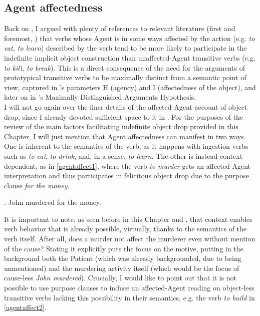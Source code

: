 \subsection{Agent affectedness} 

Back on , I argued with plenty of references to relevant literature (first and foremost, \textcite{Naess2007}) that verbs whose Agent is in some ways affected by the action (e.g. \textit{to eat, to learn}) described by the verb tend to be more likely to participate in the indefinite implicit object construction than unaffected-Agent transitive verbs (e.g. \textit{to kill, to break}). This is a direct consequence of the need for the arguments of prototypical transitive verbs to be maximally distinct from a semantic point of view, captured in \textcite{HopperThompson1980}'s parameters H (agency) and I (affectedness of the object), and later on in \textcite{Naess2007}'s Maximally Distinguished Arguments Hypothesis.\\
I will not go again over the finer details of the affected-Agent account of object drop, since I already devoted sufficient space to it in . For the purposes of the review of the main factors facilitating indefinite object drop provided in this Chapter, I will just mention that Agent affectedness can manifest in two ways. One is inherent to the semantics of the verb, as it happens with ingestion verbs such as \textit{to eat}, \textit{to drink}, and, in a sense, \textit{to learn}. The other is instead context-dependent, as in \ref{agentaffect1}, where the verb \textit{to murder} gets an affected-Agent interpretation and thus participates in felicitous object drop due to the purpose clause \textit{for the money}.

\ex. \label{agentaffect1} John murdered for the money. \hfill \parencite[136]{Naess2007}

It is important to note, as seen before in this Chapter and , that context enables verb behavior that is already possible, virtually, thanks to the semantics of the verb itself. After all, does a murder not affect the murderer even without mention of the cause? Stating it explicitly puts the focus on the motive, putting in the background both the Patient (which was already backgrounded, due to being unmentioned) and the murdering activity itself (which would be the focus of cause-less \textit{John murdered}). Crucially, I would like to point out that it is not possible to use purpose clauses to induce an affected-Agent reading on object-less transitive verbs lacking this possibility in their semantics, e.g. the verb \textit{to build} in \ref{agentaffect2}.

